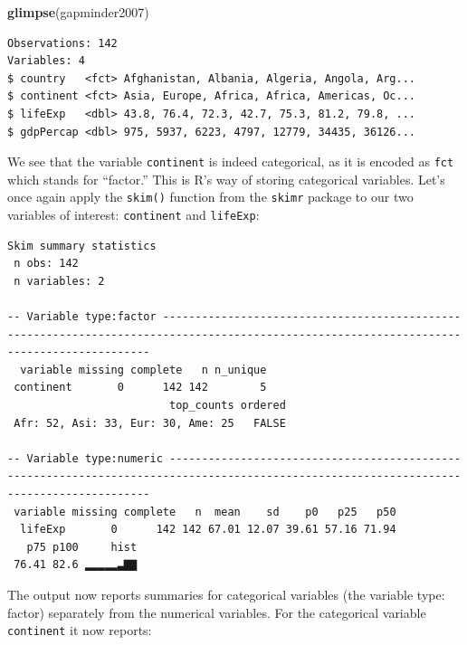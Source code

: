 \documentclass[12pt,]{krantz}
\makeatletter
\newenvironment{Shaded}{\begin{snugshade}}{\end{snugshade}}
\newcommand{\KeywordTok}[1]{\textcolor[rgb]{0.27,0.27,0.27}{\textbf{#1}}}
\newcommand{\StringTok}[1]{\textcolor[rgb]{0.5,0.5,0.5}{#1}}
\newcommand{\OperatorTok}[1]{\textcolor[rgb]{0.43,0.43,0.43}{\textbf{#1}}}
\newcommand{\NormalTok}[1]{#1}
\newenvironment{kframe}{%
\medskip{}
\setlength{\fboxsep}{.8em}
 \def\at@end@of@kframe{}%
 \ifinner\ifhmode%
  \def\at@end@of@kframe{\end{minipage}}%
  \begin{minipage}{\columnwidth}%
 \fi\fi%
 \def\FrameCommand##1{\hskip\@totalleftmargin \hskip-\fboxsep
 \colorbox{shadecolor}{##1}\hskip-\fboxsep
     \hskip-\linewidth \hskip-\@totalleftmargin \hskip\columnwidth}%
 \MakeFramed {\advance\hsize-\width
   \@totalleftmargin\z@ \linewidth\hsize
   \@setminipage}}%
 {\par\unskip\endMakeFramed%
 \at@end@of@kframe}
\renewenvironment{Shaded}{\begin{kframe}}{\end{kframe}}
\theoremstyle{definition}
\theoremstyle{definition}
\theoremstyle{definition}
\theoremstyle{remark}
\makeatother
\begin{document}
\begin{Shaded}
\begin{Highlighting}[]
\KeywordTok{glimpse}\NormalTok{(gapminder2007)}
\end{Highlighting}
\end{Shaded}

\begin{verbatim}
Observations: 142
Variables: 4
$ country   <fct> Afghanistan, Albania, Algeria, Angola, Arg...
$ continent <fct> Asia, Europe, Africa, Africa, Americas, Oc...
$ lifeExp   <dbl> 43.8, 76.4, 72.3, 42.7, 75.3, 81.2, 79.8, ...
$ gdpPercap <dbl> 975, 5937, 6223, 4797, 12779, 34435, 36126...
\end{verbatim}

We see that the variable \texttt{continent} is indeed categorical, as it
is encoded as \texttt{fct} which stands for ``factor.'' This is R's way
of storing categorical variables. Let's once again apply the
\texttt{skim()} function from the \texttt{skimr} package to our two
variables of interest: \texttt{continent} and \texttt{lifeExp}:

\begin{Shaded}
\end{Shaded}

\begin{verbatim}
Skim summary statistics
 n obs: 142 
 n variables: 2 

-- Variable type:factor ------------------------------------------------------------------------------------------------------------------------------------------
  variable missing complete   n n_unique
 continent       0      142 142        5
                         top_counts ordered
 Afr: 52, Asi: 33, Eur: 30, Ame: 25   FALSE

-- Variable type:numeric -----------------------------------------------------------------------------------------------------------------------------------------
 variable missing complete   n  mean    sd    p0   p25   p50
  lifeExp       0      142 142 67.01 12.07 39.61 57.16 71.94
   p75 p100     hist
 76.41 82.6 ▂▂▂▂▂▃▇▇
\end{verbatim}

The output now reports summaries for categorical variables (the variable
type: factor) separately from the numerical variables. For the
categorical variable \texttt{continent} it now reports:
\end{document}
